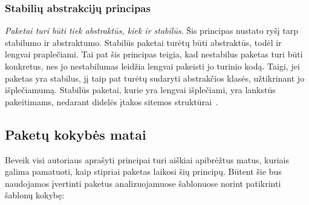 \subsubsection{Stabilių abstrakcijų principas}
\textit{Paketai turi būti tiek abstraktūs, kiek ir stabilūs}.
Šis principas nustato ryšį tarp stabilumo ir abstraktumo.
Stabilūs paketai turėtų būti abstraktūs, todėl ir lengvai praplečiami.
Tai pat šis principas teigia, kad nestabilus paketas turi būti konkretus, nes jo nestabilumas leidžia lengvai pakeisti jo turinio kodą.
Taigi, jei paketas yra stabilus, jį taip pat turėtų sudaryti abstrakčios klasės, užtikrinant jo išplečiamumą.
Stabilūs paketai, kurie yra lengvai išplečiami, yra lankstūs pakeitimams, nedarant didelės įtakos sitemos struktūrai~\cite{AgileSoftwareDevelopment}.

\subsection{Paketų kokybės matai}
Beveik visi autoriaus aprašyti principai turi aiškiai apibrėžtus matus, kuriais galima pamatuoti, kaip stipriai paketas laikosi šių principų.
Būtent šie bus naudojamos įvertinti paketus analizuojamuose šablonuose norint patikrinti šablonų kokybę:
